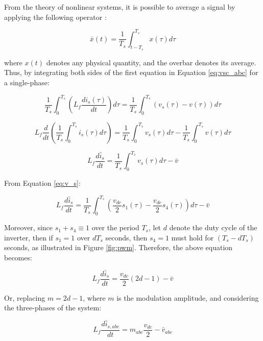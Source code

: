 From the theory of nonlinear systems, it is possible to average a signal by
applying the following operator \cite{yazdani2010voltage}:

\begin{equation*}
    \bar{x}(t) = \frac{1}{T_s}\int_{t-T_s}^{T_s}x(\tau)d\tau
\end{equation*}

\noindent where $x(t)$ denotes any physical quantity, and the overbar denotes
its average. Thus, by integrating both sides of the first equation in Equation
\ref{eq:vsc_abc} for a single-phase:

\begin{equation*}
    \frac{1}{T_s} \int_0^{T_s}\left(L_f\frac{di_{s}(\tau)}{dt}\right)d\tau = \frac{1}{T_s} \int_0^{T_s} (v_{s}(\tau) - v(\tau))d\tau
\end{equation*}

\begin{equation*}
    L_f \frac{d}{dt}\left(\frac{1}{T_s}\int_0^{T_s}i_{s}(\tau)d\tau\right) = \frac{1}{T_s}\int_0^{T_s}v_{s}(\tau)d\tau - \frac{1}{T_s}\int_0^{T_s}v(\tau)d\tau
\end{equation*}

\begin{equation*}
    L_f \frac{d\bar{i}_{s}}{dt} = \frac{1}{T_s}\int_0^{T_s}v_{s}(\tau)d\tau - \bar{v}
\end{equation*}

From Equation \ref{eq:v_s}:

\begin{equation*}
    L_f \frac{d\bar{i}_{s}}{dt} = \frac{1}{T_s}\int_0^{T_s}\left(\frac{v_{dc}}{2}s_1(\tau) - \frac{v_{dc}}{2}s_4(\tau)\right)d\tau - \bar{v}
\end{equation*}

Moreover, since $s_1 + s_4 \equiv 1$ over the period $T_s$, let $d$ denote the
duty cycle of the inverter, then if $s_1 = 1$ over $dT_s$ seconds, then $s_4 =
1$ must hold for $(T_s - dT_s)$ seconds, as illustrated in Figure \ref{fig:pwm}.
Therefore, the above equation becomes:

\begin{equation*}
    L_f \frac{d\bar{i}_{s}}{dt} = \frac{v_{dc}}{2}(2d - 1) - \bar{v}
\end{equation*}

Or, replacing $m = 2d - 1$, where $m$ is the modulation amplitude, and
considering the three-phases of the system:

\begin{equation*}
    L_f \frac{d\bar{i}_{s,abc}}{dt} = m_{abc}\frac{v_{dc}}{2} - \bar{v}_{abc}
\end{equation*}

